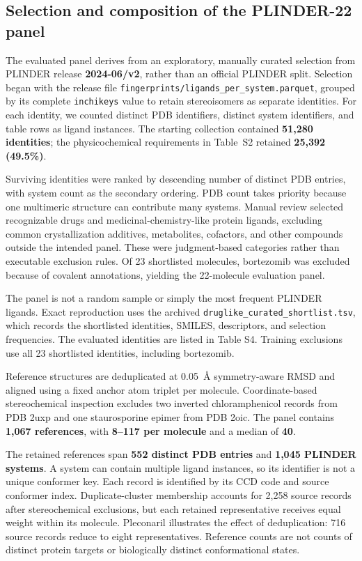 \subsection*{Selection and composition of the PLINDER-22 panel}

The evaluated panel derives from an exploratory, manually curated selection from PLINDER
release \textbf{2024-06/v2}, rather than an official PLINDER split. Selection began with the
release file \texttt{fingerprints/ligands\_per\_system.parquet}, grouped by its complete
\texttt{inchikeys} value to retain stereoisomers as separate identities. For each identity,
we counted distinct PDB identifiers, distinct system identifiers, and table rows as
ligand instances. The starting collection contained \textbf{51,280 identities}; the physicochemical
requirements in Table~S2 retained \textbf{25,392 (49.5\%)}.



Surviving identities were ranked by descending number of distinct PDB entries, with system
count as the secondary ordering. PDB count takes priority because one multimeric
structure can contribute many systems. Manual review selected recognizable drugs and
medicinal-chemistry-like protein ligands, excluding common crystallization additives,
metabolites, cofactors, and other compounds outside the intended panel. These were
judgment-based categories rather than executable exclusion rules. Of 23 shortlisted
molecules, bortezomib was excluded because of covalent annotations, yielding the
22-molecule evaluation panel.

The panel is not a random sample or simply the most frequent PLINDER ligands. Exact
reproduction uses the archived \texttt{druglike\_curated\_shortlist.tsv}, which records
the shortlisted identities, SMILES, descriptors, and selection frequencies. The
evaluated identities are listed in Table S4. Training exclusions use all 23
shortlisted identities, including bortezomib.

Reference structures are deduplicated at 0.05~\AA{} symmetry-aware RMSD and aligned
using a fixed anchor atom triplet per molecule. Coordinate-based stereochemical
inspection excludes two inverted chloramphenicol records from PDB 2uxp and one
staurosporine epimer from PDB 2oic. The panel contains \textbf{1,067 references},
with \textbf{8--117 per molecule} and a median of \textbf{40}.

\clearpage


The retained references span \textbf{552 distinct PDB entries} and \textbf{1,045 PLINDER systems}.
A system can contain multiple ligand instances, so its identifier is not a unique conformer
key. Each record is identified by its CCD code and source conformer index. Duplicate-cluster
membership accounts for 2,258 source records after stereochemical exclusions, but each
retained representative receives equal weight within its molecule. Pleconaril illustrates the
effect of deduplication: 716 source records reduce to eight representatives. Reference counts
are not counts of distinct protein targets or biologically distinct conformational states.

